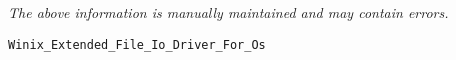 \label{pkg:winix\_data\_file\_io\_driver\_for\_posix}

{\tiny \it The above information is manually maintained and may contain errors.}
\begin{verbatim}
Winix_Extended_File_Io_Driver_For_Os
\end{verbatim}
